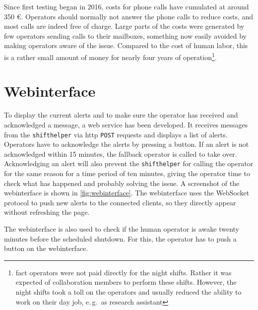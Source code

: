 Since first testing began in 2016, costs for phone calls have cumulated at around 
350 €.
Operators should normally not answer the phone calls to reduce costs,
and most calls are indeed free of charge.
Large parts of the costs were generated by few operators sending calls to their mailboxes,
something now easily avoided by making operators aware of the issue.
Compared to the cost of human labor, this is a rather small amount of money for 
nearly four years of operation\footnote{\gls{fact} operators were not paid directly 
for the night shifts. Rather it was expected of collaboration members to perform these
shifts. However, the night shifts took a toll on the operators and usually reduced 
the ability to work on their day job, e.\,g.\ as research assistant}.



\section{Webinterface}
To display the current alerts and to make sure the operator has received and acknowledged a message, a web service has been developed.
It receives messages from the \texttt{shifthelper} via http \texttt{POST} requests and
displays a list of alerts.
Operators have to acknowledge the alerts by pressing a button.
If an alert is not acknowledged within 15 minutes,
the fallback operator is called to take over.
Acknowledging an alert will also prevent the \texttt{shifthelper} for calling the operator
for the same reason for a time period of ten minutes, giving the operator time
to check what has happened and probably solving the issue.
A screenshot of the webinterface is shown in \autoref{fig:webinterface}.
The webinterface uses the WebSocket protocol to push new alerts to the connected
clients, so they directly appear without refreshing the page.

The webinterface is also used to check if the human operator is awake twenty minutes
before the scheduled shutdown.
For this, the operator has to push a button on the webinterface.

